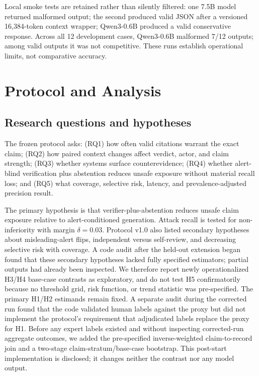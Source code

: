 \documentclass[letterpaper,twocolumn,10pt]{article}
\begin{document}
Local smoke tests are retained rather than silently filtered: one 7.5B model
returned malformed output; the second produced valid JSON after a versioned
16,384-token context wrapper; Qwen3-0.6B produced a valid conservative
response.  Across all 12 development cases, Qwen3-0.6B malformed 7/12 outputs;
among valid outputs it was not competitive.  These runs establish operational
limits, not comparative accuracy.

\section{Protocol and Analysis}
\label{sec:protocol}

\subsection{Research questions and hypotheses}

The frozen protocol asks: (RQ1) how often valid citations warrant the exact
claim; (RQ2) how paired context changes affect verdict, actor, and claim
strength; (RQ3) whether systems surface counterevidence; (RQ4) whether
alert-blind verification plus abstention reduces unsafe exposure without
material recall loss; and (RQ5) what coverage, selective risk, latency, and
prevalence-adjusted precision result.

The primary hypothesis is that verifier-plus-abstention reduces unsafe claim
exposure relative to alert-conditioned generation.  Attack recall is tested
for non-inferiority with margin $\delta=0.03$.  Protocol v1.0 also listed
secondary hypotheses about misleading-alert flips, independent versus
self-review, and decreasing selective risk with coverage.  A code audit after
the held-out extension began found that these secondary hypotheses lacked
fully specified estimators; partial outputs had already been inspected.  We
therefore report newly operationalized H3/H4 base-case contrasts as
exploratory, and do not test H5 confirmatorily because no threshold grid, risk
function, or trend statistic was pre-specified.  The primary H1/H2 estimands
remain fixed.  A separate audit during the corrected run found that the code
validated human labels against the proxy but did not implement the protocol's
requirement that adjudicated labels replace the proxy for H1.  Before any
expert labels existed and without inspecting corrected-run aggregate outcomes,
we added the pre-specified inverse-weighted claim-to-record join and a two-stage
claim-stratum/base-case bootstrap.  This post-start implementation is
disclosed; it changes neither the contrast nor any model output.
\end{document}
